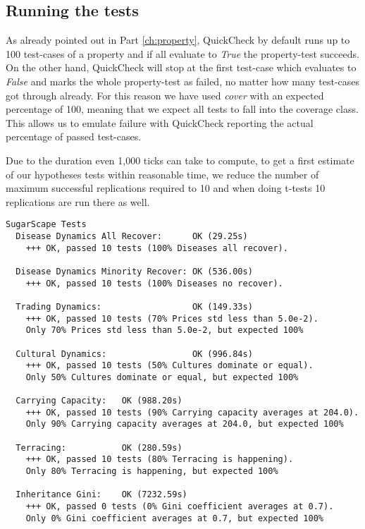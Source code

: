 
\subsection{Running the tests}
As already pointed out in Part \ref{ch:property}, QuickCheck by default runs up to 100 test-cases of a property and if all evaluate to \textit{True} the property-test succeeds. On the other hand, QuickCheck will stop at the first test-case which evaluates to \textit{False} and marks the whole property-test as failed, no matter how many test-cases got through already. For this reason we have used \textit{cover} with an expected percentage of 100, meaning that we expect all tests to fall into the coverage class. This allows us to emulate failure with QuickCheck reporting the actual percentage of passed test-cases.

Due to the duration even 1,000 ticks can take to compute, to get a first estimate of our hypotheses tests within reasonable time, we reduce the number of maximum successful replications required to 10 and when doing t-tests 10 replications are run there as well. 

\begin{verbatim}
SugarScape Tests
  Disease Dynamics All Recover:      OK (29.25s)
    +++ OK, passed 10 tests (100% Diseases all recover).
    
  Disease Dynamics Minority Recover: OK (536.00s)
    +++ OK, passed 10 tests (100% Diseases no recover).
    
  Trading Dynamics:                  OK (149.33s)
    +++ OK, passed 10 tests (70% Prices std less than 5.0e-2).
    Only 70% Prices std less than 5.0e-2, but expected 100%
    
  Cultural Dynamics:                 OK (996.84s)
    +++ OK, passed 10 tests (50% Cultures dominate or equal).
    Only 50% Cultures dominate or equal, but expected 100%
    
  Carrying Capacity:   OK (988.20s)
    +++ OK, passed 10 tests (90% Carrying capacity averages at 204.0).    
    Only 90% Carrying capacity averages at 204.0, but expected 100%
    
  Terracing:           OK (280.59s)
    +++ OK, passed 10 tests (80% Terracing is happening).
    Only 80% Terracing is happening, but expected 100%
    
  Inheritance Gini:    OK (7232.59s)
    +++ OK, passed 0 tests (0% Gini coefficient averages at 0.7).
    Only 0% Gini coefficient averages at 0.7, but expected 100%
\end{verbatim}

